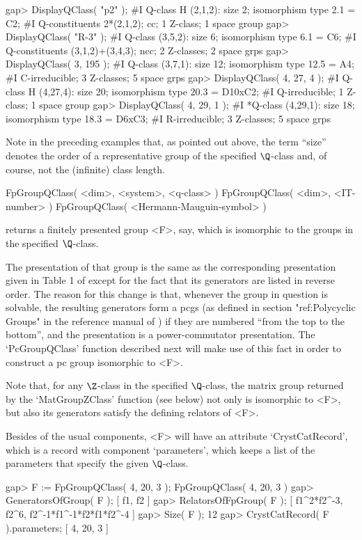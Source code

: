 \beginexample
gap> DisplayQClass( "p2" );
#I   Q-class H (2,1,2): size 2; isomorphism type 2.1 = C2;
#I    Q-constituents 2*(2,1,2); cc; 1 Z-class; 1 space group
gap> DisplayQClass( "R-3" );
#I   Q-class (3,5,2): size 6; isomorphism type 6.1 = C6;
#I    Q-constituents (3,1,2)+(3,4,3); ncc; 2 Z-classes; 2 space grps
gap> DisplayQClass( 3, 195 );
#I   Q-class (3,7,1): size 12; isomorphism type 12.5 = A4;
#I    C-irreducible; 3 Z-classes; 5 space grps
gap> DisplayQClass( 4, 27, 4 );
#I   Q-class H (4,27,4): size 20; isomorphism type 20.3 = D10xC2;
#I    Q-irreducible; 1 Z-class; 1 space group
gap> DisplayQClass( 4, 29, 1 );
#I  *Q-class (4,29,1): size 18; isomorphism type 18.3 = D6xC3;
#I    R-irreducible; 3 Z-classes; 5 space grps
\endexample

Note in the preceding examples that, as pointed out above, the term
``size'' denotes the order of a representative group of the specified
$\Q$-class and, of course, not the (infinite) class length.

\>FpGroupQClass( <dim>, <system>, <q-class> )
\>FpGroupQClass( <dim>, <IT-number> )
\>FpGroupQClass( <Hermann-Mauguin-symbol> )

returns a finitely presented group <F>, say, which is isomorphic to
the groups in the specified $\Q$-class.

The presentation of that group is the same as the corresponding
presentation given in Table 1 of \cite{BBNWZ78} except for the fact
that its generators are listed in reverse order.  The reason for this
change is that, whenever the group in question is solvable, the
resulting generators form a pcgs (as defined in section "ref:Polycyclic
Groups" in the reference manual of {\GAP}) if they are numbered 
``from the top to the bottom'', and the presentation is a 
power-commutator presentation.  The `PcGroupQClass' function described 
next will make use of this fact in order to construct a pc group 
isomorphic to <F>.

Note that, for any $\Z$-class  in the  specified $\Q$-class,  the  matrix
group  returned by the `MatGroupZClass'  function (see below) not only is
isomorphic to <F>, but also its  generators satisfy the defining relators
of <F>.

Besides  of the usual components,  <F> will have an attribute
`CrystCatRecord', which is a record with component
`parameters', which keeps a list of the parameters
that specify the given $\Q$-class.

\beginexample
gap> F := FpGroupQClass( 4, 20, 3 );
FpGroupQClass( 4, 20, 3 )
gap> GeneratorsOfGroup( F );
[ f1, f2 ]
gap> RelatorsOfFpGroup( F );
[ f1^2*f2^-3, f2^6, f2^-1*f1^-1*f2*f1*f2^-4 ]
gap> Size( F );
12
gap> CrystCatRecord( F ).parameters;
[ 4, 20, 3 ]
\endexample

